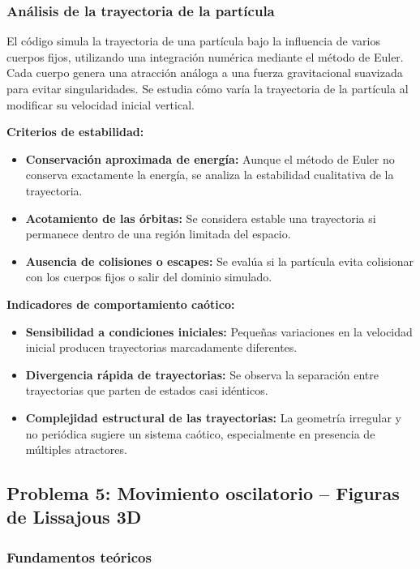 \documentclass{article}
\begin{document}
\begin{center}
    \subsubsection{Análisis de la trayectoria de la partícula}

El código simula la trayectoria de una partícula bajo la influencia de varios cuerpos fijos, utilizando una integración numérica mediante el método de Euler. Cada cuerpo genera una atracción análoga a una fuerza gravitacional suavizada para evitar singularidades. Se estudia cómo varía la trayectoria de la partícula al modificar su velocidad inicial vertical.

\textbf{Criterios de estabilidad:}
\begin{itemize}
\item \textbf{Conservación aproximada de energía:} Aunque el método de Euler no conserva exactamente la energía, se analiza la estabilidad cualitativa de la trayectoria.
\item \textbf{Acotamiento de las órbitas:} Se considera estable una trayectoria si permanece dentro de una región limitada del espacio.
\item \textbf{Ausencia de colisiones o escapes:} Se evalúa si la partícula evita colisionar con los cuerpos fijos o salir del dominio simulado.
\end{itemize}

\textbf{Indicadores de comportamiento caótico:}
\begin{itemize}
\item \textbf{Sensibilidad a condiciones iniciales:} Pequeñas variaciones en la velocidad inicial producen trayectorias marcadamente diferentes.
\item \textbf{Divergencia rápida de trayectorias:} Se observa la separación entre trayectorias que parten de estados casi idénticos.
\item \textbf{Complejidad estructural de las trayectorias:} La geometría irregular y no periódica sugiere un sistema caótico, especialmente en presencia de múltiples atractores.
\end{itemize}

	\subsection{Problema 5: Movimiento oscilatorio -- Figuras de Lissajous 3D}
	
	\subsubsection{Fundamentos teóricos}
	

\end{center}
\end{document}
